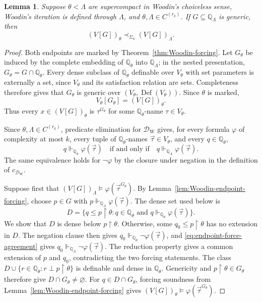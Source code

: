 \documentclass[11pt,a4paper]{amsart}
\newcommand{\Def}{\operatorname{Def}}
\newcommand{\restr}{\mathbin{\upharpoonright}}
\theoremstyle{plain}
\newtheorem{lemma}[theorem]{Lemma}
\theoremstyle{definition}
\theoremstyle{remark}
\begin{document}
\begin{lemma}\label{lem:finite-windows}
Suppose $\theta<\Lambda$ are supercompact in Woodin's choiceless sense, Woodin's iteration is defined through $\Lambda$, and $\theta,\Lambda\in C^{(r_k)}$.  If $G\subseteq\mathbb Q_\Lambda$ is generic, then
\[
(V[G])_\theta\prec_{\Sigma_k}(V[G])_\Lambda.
\]
\end{lemma}

\begin{proof}
  Both endpoints are marked by Theorem~\ref{thm:Woodin-forcing}.  Let $G_\theta$ be induced by the complete embedding of $\mathbb Q_\theta$ into $\mathbb Q_\Lambda$; in the nested presentation, $G_\theta=G\cap\mathbb Q_\theta$.  Every dense subclass of $\mathbb Q_\theta$ definable over $V_\theta$ with set parameters is externally a set, since $V_\theta$ and its satisfaction relation are sets.  Completeness therefore gives that $G_\theta$ is generic over $(V_\theta,\Def(V_\theta))$.  Since $\theta$ is marked,
  \[
  V_\theta[G_\theta]=(V[G])_\theta.
  \]
  Thus every $x\in(V[G])_\theta$ is $\tau^{G_\theta}$ for some $\mathbb Q_\theta$-name $\tau\in V_\theta$.

Since $\theta,\Lambda\in C^{(r_k)}$, predicate elimination for $\mathcal D_{\mathrm W}$ gives, for every formula $\varphi$ of complexity at most $k$, every tuple of $\mathbb Q_\theta$-names $\vec\tau\in V_\theta$, and every $q\in\mathbb Q_\theta$,
\begin{equation}\label{eq:endpoint-force-agreement}
q\Vdash_{\mathbb Q_\theta}\varphi(\vec\tau)
\quad\text{if and only if}\quad
q\Vdash_{\mathbb Q_\Lambda}\varphi(\vec\tau).
\end{equation}
The same equivalence holds for $\neg\varphi$ by the closure under negation in the definition of $c_{\mathcal D_{\mathrm W}}$.

Suppose first that $(V[G])_\Lambda\models\varphi(\vec\tau^{G_\theta})$.  By Lemma~\ref{lem:Woodin-endpoint-forcing}, choose $p\in G$ with $p\Vdash_{\mathbb Q_\Lambda}\varphi(\vec\tau)$.  The dense set used below is
\[
D=\{q\leq p\restr\theta:q\in\mathbb Q_\theta\text{ and }q\Vdash_{\mathbb Q_\theta}\varphi(\vec\tau)\}.
\]
We show that $D$ is dense below $p\restr\theta$.  Otherwise, some $q_0\leq p\restr\theta$ has no extension in $D$.  The negation clause then gives $q_0\Vdash_{\mathbb Q_\theta}\neg\varphi(\vec\tau)$, and \eqref{eq:endpoint-force-agreement} gives $q_0\Vdash_{\mathbb Q_\Lambda}\neg\varphi(\vec\tau)$.  The reduction property gives a common extension of $p$ and $q_0$, contradicting the two forcing statements.  The class $D\cup\{r\in\mathbb Q_\theta:r\perp p\restr\theta\}$ is definable and dense in $\mathbb Q_\theta$.  Genericity and $p\restr\theta\in G_\theta$ therefore give $D\cap G_\theta\ne\varnothing$.  For $q\in D\cap G_\theta$, forcing soundness from Lemma~\ref{lem:Woodin-endpoint-forcing} gives $(V[G])_\theta\models\varphi(\vec\tau^{G_\theta})$.


\end{proof}
\end{document}
